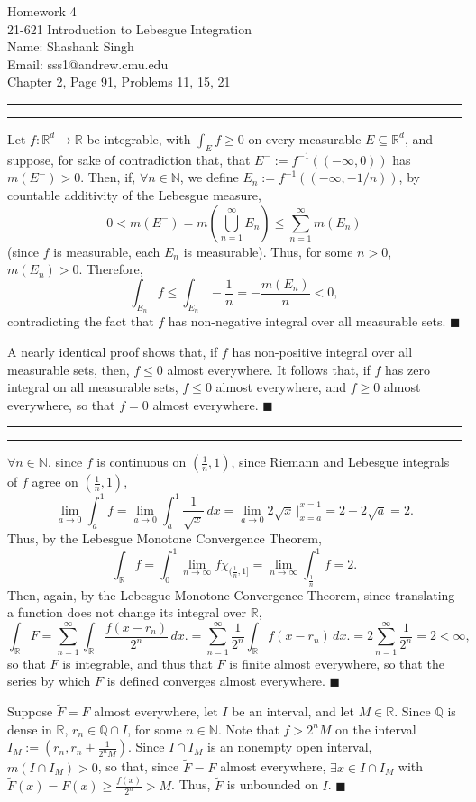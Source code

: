 \documentclass[11pt]{article}
\makeatletter
\newcounter{questionCounter}
\newcounter{partCounter}[questionCounter]
\newenvironment{question}[2][\arabic{questionCounter}]{%
    \setcounter{partCounter}{0}%
    \vspace{.25in} \hrule \vspace{0.5em}%
        \noindent{\bf #2}%
    \vspace{0.8em} \hrule \vspace{.10in}%
    \addtocounter{questionCounter}{1}%
}{}
\newcommand{\myname}{Shashank Singh}
\newcommand{\myandrew}{sss1@andrew.cmu.edu}
\newcommand{\myclass}{21-621 Introduction to Lebesgue Integration}
\newcommand{\myhwnum}{4}
\newcommand{\duedate}{Wednesday, December 5, 2012}
\newcommand{\problemlist}{Chapter 2, Page 91, Problems 11, 15, 21}
\renewcommand{\qed}{\quad $\blacksquare$}
\newcommand{\inv}{^{-1}}
\newcommand{\N}{\mathbb{N}} %
\newcommand{\Q}{\mathbb{Q}} %
\newcommand{\R}{\mathbb{R}} %
\makeatother
\begin{document}
\thispagestyle{plain}

{\Large Homework \myhwnum} \\
\myclass \\
Name: \myname \\
Email: \myandrew \\
\problemlist \\
\begin{question}{Problem 11}
Let $f : \R^d \rightarrow \R$ be integrable, with $\int_E f \geq 0$ on every
measurable $E \subseteq \R^d$, and suppose, for sake of contradiction that,
that $E^- := f\inv((-\infty, 0))$ has $m(E^-) > 0$. Then, if,
$\forall n \in \N$, we define $E_n := f\inv((-\infty, -1/n))$, by countable
additivity of the Lebesgue measure,
\[
0
 < m(E^-)
 = m\left( \bigcup_{n = 1}^{\infty} E_n \right)
 \leq \sum_{n = 1}^{\infty} m(E_n)
\]
(since $f$ is measurable, each $E_n$ is measurable).
Thus, for some $n > 0$, $m(E_n) > 0$. Therefore,
\[
\int_{E_n} f
 \leq \int_{E_n} -\frac{1}{n}
 = -\frac{m(E_n)}{n}
 < 0,
\]
contradicting the fact that $f$ has non-negative integral over all measurable
sets. \qed

A nearly identical proof shows that, if $f$ has non-positive integral over
all measurable sets, then, $f \leq 0$ almost everywhere. It follows that, if
$f$ has zero integral on all measurable sets, $f \leq 0$ almost everywhere,
and $f \geq 0$ almost everywhere, so that $f = 0$ almost everywhere. \qed
\end{question}

\begin{question}{Problem 15}
$\forall n \in \N$, since $f$ is continuous on
$\left( \frac{1}{n}, 1 \right)$, since Riemann and Lebesgue integrals of $f$
agree on $\left( \frac{1}{n}, 1 \right)$,
\[\lim_{a \rightarrow 0} \int_a^1 f
 = \lim_{a \rightarrow 0} \int_a^1 \frac{1}{\sqrt{x}} \, dx
 = \lim_{a \rightarrow 0} 2\sqrt{x} \, \Big|_{x = a}^{x = 1} = 2 - 2\sqrt{a}
 = 2.
\]
Thus, by the Lebesgue Monotone Convergence Theorem, 
\[\int_{\R} f
 = \int_0^1 \lim_{n \rightarrow \infty} f\chi_{(\frac{1}{n}, 1]}
 = \lim_{n \rightarrow \infty} \int_\frac{1}{n}^1 f
 = 2.
\]
Then, again, by the Lebesgue Monotone Convergence Theorem, since translating a
function does not change its integral over $\R$,
\[\int_{\R} F
 = \sum_{n = 1}^{\infty} \int_{\R} \frac{f(x - r_n)}{2^n} \, dx.
 = \sum_{n = 1}^{\infty} \frac{1}{2^n} \int_{\R} f(x - r_n) \, dx.
 = 2 \sum_{n = 1}^{\infty} \frac{1}{2^n}
 = 2
 < \infty,
\]
so that $F$ is integrable, and thus that $F$ is finite almost everywhere, so
that the series by which $F$ is defined converges almost everywhere. \qed

Suppose $\tilde{F} = F$ almost everywhere, let $I$ be an interval, and let
$M \in \R$. Since $\Q$ is dense in $\R$, $r_n \in \Q \cap I$, for some
$n \in \N$. Note that $f > 2^nM$ on the interval
$I_M := \left( r_n, r_n + \frac{1}{2^nM} \right)$. Since $I \cap I_M$ is an
nonempty open interval, $m(I \cap I_M) > 0$, so that, since $\tilde{F} = F$
almost everywhere, $\exists x \in I \cap I_M$ with
$\tilde{F}(x) = F(x) \geq \frac{f(x)}{2^n} > M$. Thus, $\tilde{F}$ is
unbounded on $I$. \qed
\end{question}
\end{document}
